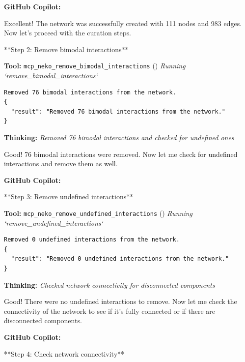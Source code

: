 \documentclass[11pt,a4paper]{article}
\begin{document}
\begin{copilotbox}
\textbf{GitHub Copilot:}

Excellent! The network was successfully created with 111 nodes and 983 edges. Now let's proceed with the curation steps.

**Step 2: Remove bimodal interactions**

\end{copilotbox}
\begin{toolokbox}
\textbf{Tool:} \texttt{mcp\_neko\_remove\_bimodal\_interactions} (\checkmark)
\textit{Running `remove\_bimodal\_interactions`}
\begin{lstlisting}
Removed 76 bimodal interactions from the network.
{
  "result": "Removed 76 bimodal interactions from the network."
}
\end{lstlisting}
\end{toolokbox}
\begin{thinkbox}
\textbf{Thinking:} \textit{Removed 76 bimodal interactions and checked for undefined ones}

Good! 76 bimodal interactions were removed. Now let me check for undefined interactions and remove them as well.

\end{thinkbox}
\begin{copilotbox}
\textbf{GitHub Copilot:}

**Step 3: Remove undefined interactions**

\end{copilotbox}
\begin{toolokbox}
\textbf{Tool:} \texttt{mcp\_neko\_remove\_undefined\_interactions} (\checkmark)
\textit{Running `remove\_undefined\_interactions`}
\begin{lstlisting}
Removed 0 undefined interactions from the network.
{
  "result": "Removed 0 undefined interactions from the network."
}
\end{lstlisting}
\end{toolokbox}
\begin{thinkbox}
\textbf{Thinking:} \textit{Checked network connectivity for disconnected components}

Good! There were no undefined interactions to remove. Now let me check the connectivity of the network to see if it's fully connected or if there are disconnected components.

\end{thinkbox}
\begin{copilotbox}
\textbf{GitHub Copilot:}

**Step 4: Check network connectivity**

\end{copilotbox}
\end{document}

